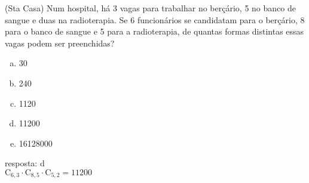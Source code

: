 \begin{ex}
 	(Sta Casa) Num hospital, há 3 vagas para trabalhar no berçário, 5 no banco de sangue e duas na radioterapia. Se 6 funcionários se candidatam para o berçário, 8 para o banco de sangue e 5 para a radioterapia, de quantas formas distintas essas vagas podem ser preenchidas?
    \begin{enumerate}[(a)]
    \item 30
    \item 240
    \item 1120
    \item 11200
    \item 16128000
    \end{enumerate}
      \begin{sol}
       resposta: d \\
       $\mathrm{C}_{6,3}\cdot\mathrm{C}_{8,5}\cdot \mathrm{C}_{5,2}=11200$
      \end{sol}
\end{ex}